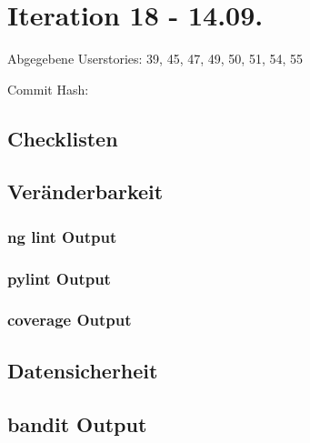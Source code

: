 \section*{Iteration 18 - 14.09.}
	Abgegebene Userstories: 39, 45, 47, 49, 50, 51, 54, 55
	
	Commit Hash: 
	
	\subsection{Checklisten}
	
	
	
	
	
	
	
	
	\subsection*{Veränderbarkeit}
	\subsubsection*{ng lint Output}
	

	\subsubsection*{pylint Output}
	

	\subsubsection*{coverage Output}
	

	\subsection*{Datensicherheit}
	\subsection*{bandit Output}
	
	
